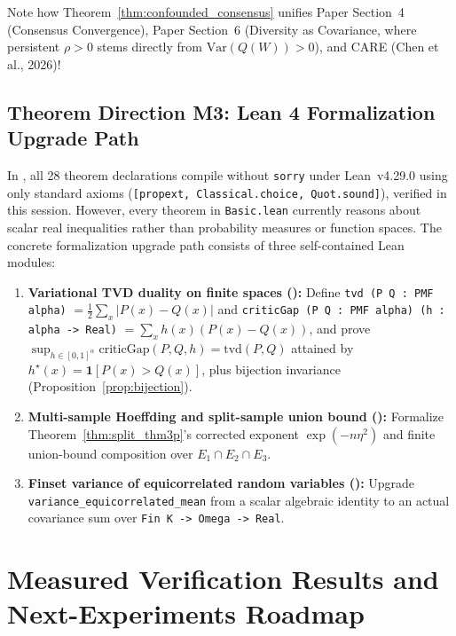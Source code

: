 \documentclass[11pt]{article}
\newcommand{\Var}{\mathrm{Var}}
\newcommand{\ind}{\mathbf{1}}
\begin{document}
Note how Theorem~\ref{thm:confounded_consensus} unifies Paper Section~4 (Consensus Convergence), Paper Section~6 (Diversity as Covariance, where persistent $\rho > 0$ stems directly from $\Var(Q(W)) > 0$), and CARE (Chen et al., 2026)!

\subsection{Theorem Direction M3: Lean 4 Formalization Upgrade Path}
\label{sec:lean_roadmap}

In , all 28 theorem declarations compile without \texttt{sorry} under Lean~v4.29.0 using only standard axioms (\texttt{[propext, Classical.choice, Quot.sound]}), verified in this session. However, every theorem in \texttt{Basic.lean} currently reasons about scalar real inequalities rather than probability measures or function spaces. The concrete formalization upgrade path consists of three self-contained Lean modules:
\begin{enumerate}[leftmargin=*,itemsep=2pt]
\item \textbf{Variational TVD duality on finite spaces ():} Define \texttt{tvd (P Q : PMF alpha)} $= \frac{1}{2}\sum_x |P(x) - Q(x)|$ and \texttt{criticGap (P Q : PMF alpha) (h : alpha -> Real)} $= \sum_x h(x)(P(x) - Q(x))$, and prove $\sup_{h \in [0,1]^\alpha} \mathrm{criticGap}(P,Q,h) = \mathrm{tvd}(P,Q)$ attained by $h^\star(x) = \ind[P(x) > Q(x)]$, plus bijection invariance (Proposition~\ref{prop:bijection}).
\item \textbf{Multi-sample Hoeffding and split-sample union bound ():} Formalize Theorem~\ref{thm:split_thm3p}'s corrected exponent $\exp(-n\eta^2)$ and finite union-bound composition over $E_1 \cap E_2 \cap E_3$.
\item \textbf{Finset variance of equicorrelated random variables ():} Upgrade \texttt{variance\_equicorrelated\_mean} from a scalar algebraic identity to an actual covariance sum over \texttt{Fin K -> Omega -> Real}.
\end{enumerate}

\section{Measured Verification Results and Next-Experiments Roadmap}
\label{sec:results_roadmap}
\end{document}

